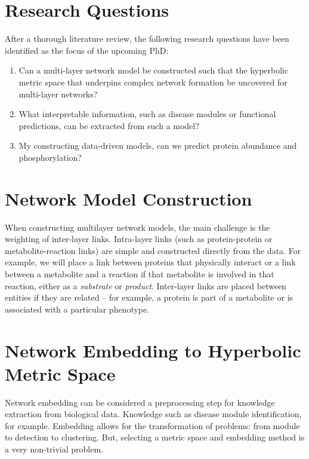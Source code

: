 \documentclass[
11pt, %
english, %
singlespacing, %
headsepline, %
]{MastersDoctoralThesis} %
\begin{document}
\section{Research Questions}
After a thorough literature review, the following research questions have been identified as the focus of the upcoming PhD:

\begin{enumerate}
	\item Can a multi-layer network model be constructed such that the hyperbolic metric space that underpins complex network formation be uncovered for multi-layer networks?
	\item What interpretable information, such as disease modules or functional predictions, can be extracted from such a model?
	\item My constructing data-driven models, can we predict protein abundance and phosphorylation?
\end{enumerate}

\section{Network Model Construction}
When constructing multilayer network models, the main challenge is the weighting of inter-layer links. Intra-layer links (such as protein-protein or metabolite-reaction links) are simple and constructed directly from the data. For example, we will place a link between proteins that physically interact or a link between a metabolite and a reaction if that metabolite is involved in that reaction, either as a \textit{substrate} or \textit{product}. Inter-layer links are placed between entities if they are related -- for example, a protein is part of a metabolite or is associated with a particular phenotype. 

\section{Network Embedding to Hyperbolic Metric Space}
Network embedding can be considered a preprocessing step for knowledge extraction from biological data. Knowledge such as disease module identification, for example. Embedding allows for the transformation of problems: from module to detection to clustering. But, selecting a metric space and embedding method is a very non-trivial problem. 
\end{document}
